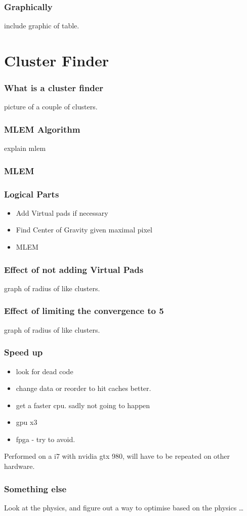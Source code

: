 \documentclass{beamer}
\begin{document}
\begin{frame}
  \frametitle{Graphically}
  include graphic of table.
\end{frame}
\section{Cluster Finder}

\begin{frame}
\frametitle{What is a cluster finder} 
picture of a couple of clusters.
\end{frame}

\begin{frame}
  \frametitle{MLEM Algorithm}
explain mlem
\end{frame}

\begin{frame}
  \frametitle{MLEM }

\end{frame}


\begin{frame}
  \frametitle{Logical Parts}
  \begin{itemize}
    \item Add Virtual pads if necessary  
    \item Find Center of Gravity given maximal pixel
    \item MLEM
  \end{itemize}
\end{frame}

\begin{frame}
  \frametitle{Effect of not adding Virtual Pads}
graph of radius of like clusters.
\end{frame}

\begin{frame}
  \frametitle{Effect of limiting the convergence to 5}
graph of radius of like clusters.
\end{frame}

\begin{frame}
  \frametitle{Speed up}
\begin{itemize}
  \item look for dead code
  \item change data or reorder to hit caches better.
  \item get a faster cpu. sadly not going to happen
  \item gpu x3 
  \item fpga - try to avoid.
\end{itemize}
Performed on a i7 with nvidia gtx 980, will have to be repeated on other hardware.
\end{frame}

\begin{frame}
\frametitle{Something else}
Look at the physics, and figure out a way to optimise based on the physics \ldots
\end{frame}
\end{document}
